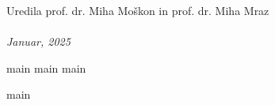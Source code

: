 \documentclass[graybox, envcountchap]{svmult}
\begin{document}
\begin{otherlanguage}{slovene}
\large Uredila prof. dr. Miha Moškon in prof. dr. Miha Mraz\\
\\
\normalsize \emph{Januar, 2025}




%
%



\tableofcontents
%
%


%
{main}
{main}
{main}
\end{otherlanguage}
{main}
%

%
%



\backmatter





\end{document}

